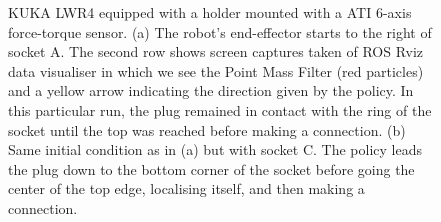 \begin{figure}
 \centering
 \caption{KUKA LWR4 equipped with a holder mounted with a ATI 6-axis force-torque sensor. (a) The robot's end-effector starts to the 
 right of socket A. The second row shows screen captures taken of ROS Rviz data visualiser in which we see the Point Mass Filter 
 (red particles) and a yellow arrow indicating the direction given by the policy. In this particular run, the plug remained in contact with the ring of the socket until 
 the top was reached before making a connection. (b) Same initial condition as in (a) but with socket C. The policy leads the plug down to 
 the bottom corner of the socket before going the center of the top edge, localising itself, and then making a connection.}
 \label{fig:real_pictures}
\end{figure}

